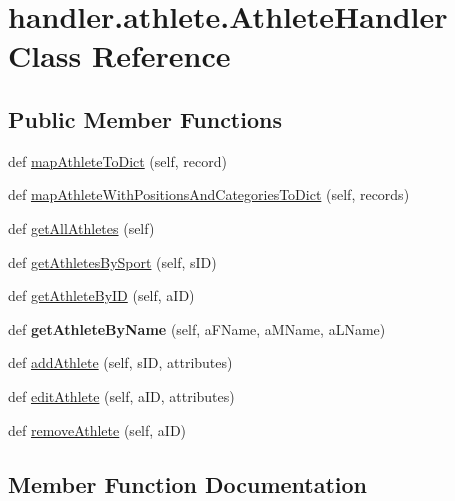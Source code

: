 \hypertarget{classhandler_1_1athlete_1_1_athlete_handler}{}\section{handler.\+athlete.\+Athlete\+Handler Class Reference}
\label{classhandler_1_1athlete_1_1_athlete_handler}
\subsection*{Public Member Functions}
\begin{DoxyCompactItemize}
\item 
def \hyperlink{classhandler_1_1athlete_1_1_athlete_handler_a953b9be16453dce8e25f08d2c53413f0}{map\+Athlete\+To\+Dict} (self, record)
\item 
def \hyperlink{classhandler_1_1athlete_1_1_athlete_handler_a53d7b2d7abc4fe899194f146763d3287}{map\+Athlete\+With\+Positions\+And\+Categories\+To\+Dict} (self, records)
\item 
def \hyperlink{classhandler_1_1athlete_1_1_athlete_handler_aae7ac6fee7495a16818e09a8946ead32}{get\+All\+Athletes} (self)
\item 
def \hyperlink{classhandler_1_1athlete_1_1_athlete_handler_af33bd416854d51f10a33aa264f1e3b2f}{get\+Athletes\+By\+Sport} (self, s\+ID)
\item 
def \hyperlink{classhandler_1_1athlete_1_1_athlete_handler_a7261ed3d7231ef7bdb261863414be608}{get\+Athlete\+By\+ID} (self, a\+ID)
\item 
\mbox{\label{classhandler_1_1athlete_1_1_athlete_handler_ae32bb30286d76da5e4b5d17e211ce80b}} 
def {\bfseries get\+Athlete\+By\+Name} (self, a\+F\+Name, a\+M\+Name, a\+L\+Name)
\item 
def \hyperlink{classhandler_1_1athlete_1_1_athlete_handler_a08fe0c2dab373f26b69dbab68a1b2a72}{add\+Athlete} (self, s\+ID, attributes)
\item 
def \hyperlink{classhandler_1_1athlete_1_1_athlete_handler_af2953ad06fe27a2bd718a83cde63272b}{edit\+Athlete} (self, a\+ID, attributes)
\item 
def \hyperlink{classhandler_1_1athlete_1_1_athlete_handler_a9f3ea8fb6c3c156f89c2b2a5bda6e689}{remove\+Athlete} (self, a\+ID)
\end{DoxyCompactItemize}


\subsection{Member Function Documentation}
\mbox{\label{classhandler_1_1athlete_1_1_athlete_handler_a08fe0c2dab373f26b69dbab68a1b2a72}} 
